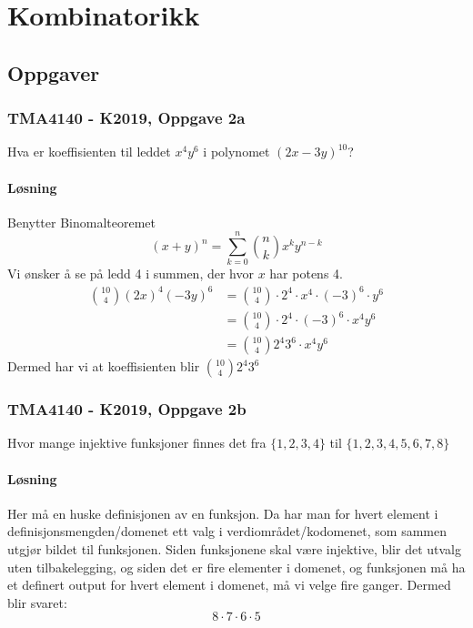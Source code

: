\section{Kombinatorikk}


\subsection{Oppgaver}
\subsubsection{TMA4140 - K2019, Oppgave 2a}
Hva er koeffisienten til leddet $x^4 y^6$ i polynomet $(2x-3y)^{10}$?

\paragraph*{Løsning}

Benytter Binomalteoremet
\[
(x+y)^n=\sum_{k=0}^{n}\binom{n}{k} x^k y^{n-k}
\]
Vi ønsker å se på ledd 4 i summen, der hvor $x$ har potens 4.
\begin{align}
    \binom{10}{4}(2x)^4(-3y)^6 &= \binom{10}{4}\cdot 2^4 \cdot x^4 \cdot (-3)^6 \cdot y^6\\
    &= \binom{10}{4}\cdot 2^4 \cdot (-3)^6 \cdot x^4 y^6\\
    &= \binom{10}{4} 2^4 3^6 \cdot x^4 y^6
\end{align}
Dermed har vi at koeffisienten blir $\binom{10}{4} 2^4 3^6 $

\subsubsection{TMA4140 - K2019, Oppgave 2b}
Hvor mange injektive funksjoner finnes det fra $\{1,2,3,4\}$ til $\{1,2,3,4,5,6,7,8\}$

\paragraph*{Løsning} 

Her må en huske definisjonen av en funksjon. Da har man for hvert element i definisjonsmengden/domenet 
ett valg i verdiområdet/kodomenet, som sammen utgjør bildet til funksjonen. Siden funksjonene skal være
injektive, blir det utvalg uten tilbakelegging, og siden det er fire elementer i domenet, og funksjonen
må ha et definert output for hvert element i domenet, må vi velge fire ganger. Dermed blir svaret:
\[
8\cdot 7 \cdot 6\cdot 5   
\]